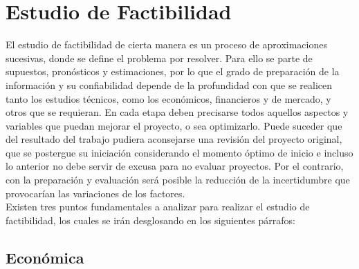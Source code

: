 \newpage
\section{Estudio de Factibilidad}

El estudio de factibilidad de cierta manera es un proceso de aproximaciones sucesivas, donde se define el problema por resolver. Para ello se parte de supuestos, pronósticos y estimaciones, por lo que el grado de preparación de la información y su confiabilidad depende de la profundidad con que se realicen tanto los estudios técnicos, como los económicos, financieros y de mercado, y otros que se requieran. En cada etapa deben precisarse todos aquellos aspectos y variables que puedan mejorar el proyecto, o sea optimizarlo. Puede suceder que del resultado del trabajo pudiera aconsejarse una revisión del proyecto original, que se postergue su iniciación considerando el momento óptimo de inicio e incluso lo anterior no debe servir de excusa para no evaluar proyectos. Por el contrario, con la preparación y evaluación será posible la reducción de la incertidumbre que provocarían las variaciones de los factores. \cite{16} \\

Existen tres puntos fundamentales a analizar para realizar el estudio de factibilidad, los cuales se irán desglosando en los siguientes párrafos:

\subsection{Económica}

